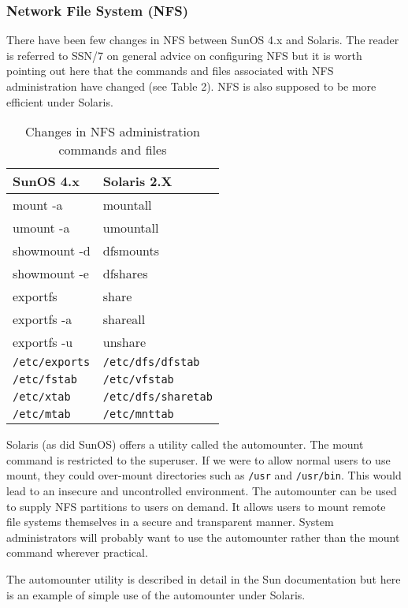 \subsubsection{Network File System (NFS)}

There have been few changes in NFS between SunOS 4.x and
Solaris. The reader is referred to SSN/7 on general advice on
configuring NFS but it is worth pointing out here that the commands
and files associated with NFS administration have changed (see Table 2).
NFS is also supposed to be more efficient under Solaris.

\begin{table}[htb]
\begin{center}
\begin{tabular}{||l|l||}
\hline

SunOS 4.x & Solaris 2.X\\
\hline
mount -a 		&       mountall     	\\
umount -a		&	umountall	\\
showmount -d		&	dfsmounts	\\
showmount -e		&	dfshares	\\
exportfs		&	share		\\
exportfs -a		&	shareall	\\
exportfs -u		&	unshare		\\
\hline
{\tt /etc/exports}	& {\tt /etc/dfs/dfstab} \\
{\tt /etc/fstab}	& {\tt /etc/vfstab}	\\
{\tt /etc/xtab}		& {\tt /etc/dfs/sharetab} \\
{\tt /etc/mtab}		& {\tt /etc/mnttab}	\\
\hline
\end {tabular}
\caption{Changes in NFS administration commands and files}
\end{center}
\end {table}


Solaris (as did SunOS) offers a utility called the automounter. The mount command is restricted
to the superuser. If we were to allow normal users to use mount, they could
over-mount directories such as {\tt /usr} and {\tt /usr/bin}. This would lead to an
insecure and uncontrolled environment. The automounter can be used to supply
NFS partitions to users on demand. It allows users to mount remote file
systems themselves in a secure and transparent manner. System administrators
will probably want to use the automounter rather than the mount command
wherever practical.

The automounter utility is described in detail in the Sun documentation but
here is an example of simple use of the automounter under Solaris.


